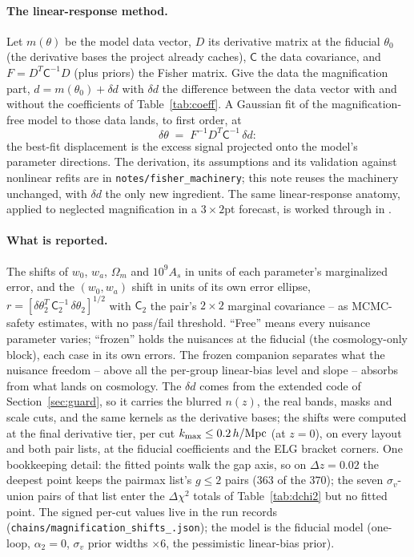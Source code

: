 \documentclass[11pt]{article}
\newcommand{\kmax}{k_{\rm max}}
\newcommand{\hMpc}{\,h/{\rm Mpc}}
\newcommand{\us}{\_\allowbreak}
\begin{document}
\paragraph{The linear-response method.}
Let $m(\theta)$ be the model data vector, $D$ its derivative matrix
at the fiducial $\theta_0$ (the derivative bases the project already
caches), $\mathsf{C}$ the data covariance, and $F = D^T \mathsf{C}^{-1} D$
(plus priors) the Fisher matrix.  Give the data the magnification
part, $d = m(\theta_0) + \delta d$ with $\delta d$ the
difference between the data vector with and without the coefficients
of Table~\ref{tab:coeff}.  A Gaussian fit of the magnification-free
model to those data lands, to first order, at
\begin{equation}
  \delta\theta \;=\; F^{-1} D^T \mathsf{C}^{-1}\, \delta d :
  \label{eq:linresp}
\end{equation}
the best-fit displacement is the excess signal projected onto the
model's parameter directions.  The derivation, its assumptions and
its validation against nonlinear refits are in
\texttt{notes/fisher\us machinery}; this note reuses the machinery
unchanged, with $\delta d$ the only new ingredient.  The same
linear-response anatomy, applied to neglected magnification in a
$3\times2$pt forecast, is worked through in \cite{Thiele2020}.

\paragraph{What is reported.}
The shifts of $w_0$, $w_a$, $\Omega_m$ and $10^9 A_s$ in units of
each parameter's marginalized error, and the $(w_0, w_a)$ shift in
units of its own error ellipse,
$r = [\delta\theta_2^T\, \mathsf{C}_2^{-1}\, \delta\theta_2]^{1/2}$
with $\mathsf{C}_2$ the pair's $2\times2$ marginal covariance -- as
MCMC-safety estimates, with no pass/fail threshold.  ``Free'' means
every nuisance parameter varies; ``frozen'' holds the nuisances at
the fiducial (the cosmology-only block), each case in its own
errors.  The frozen companion separates what the nuisance freedom --
above all the per-group linear-bias level and slope -- absorbs from
what lands on cosmology.  The $\delta d$ comes from the extended
code of Section~\ref{sec:guard}, so it carries the blurred $n(z)$,
the real bands, masks and scale cuts, and the same kernels as the
derivative bases; the shifts were computed at the final derivative
tier, per cut $\kmax \le 0.2\hMpc$ (at $z = 0$), on every layout and
both pair lists, at the fiducial coefficients and the ELG bracket
corners.  One bookkeeping detail: the fitted points walk the gap
axis, so on $\Delta z = 0.02$ the deepest point keeps the pairmax
list's $g \le 2$ pairs ($363$ of the $370$); the seven
$\sigma_v$-union pairs of that list enter the $\Delta\chi^2$ totals
of Table~\ref{tab:dchi2} but no fitted point.  The signed per-cut values live in the run records
(\texttt{chains/magnification\us shifts\us *.json}); the model is the
fiducial model (one-loop, $\alpha_2 = 0$, $\sigma_v$ prior widths
$\times 6$, the pessimistic linear-bias prior).
\end{document}
